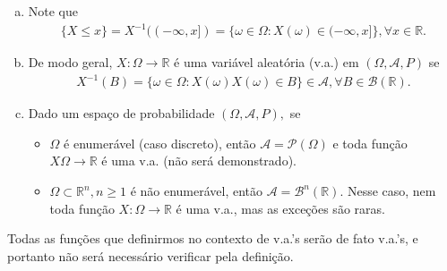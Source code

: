 \documentclass[../Notas.tex]{subfiles}
\begin{document}
\begin{remarks}
\begin{enumerate}[(a)]
    \item Note que
    \begin{align*}
        \{ X\leq x \} = X^{-1}((-\infty, x]) = \{ \omega\in\Omega : X(\omega) \in (-\infty, x] \}, \forall x\in\mathbb{R}.
    \end{align*}
    \item De modo geral, $X:\Omega\to\mathbb{R}$ é uma variável aleatória (v.a.) em $(\Omega, \mathcal{A}, P)$ se
    \begin{align*}
        X^{-1}(B) = \{ \omega\in\Omega : X(\omega) X(\omega)\in B \}\in\mathcal{A}, \forall B\in\mathcal{B}(\mathbb{R}).
    \end{align*}
    \item Dado um espaço de probabilidade $(\Omega, \mathcal{A}, P),$ se
    \begin{itemize}
        \item $\Omega$ é enumerável (caso discreto), então $\mathcal{A} = \mathcal{P}(\Omega)$ e toda função $X\Omega\to\mathbb{R}$ é uma v.a. (não será demonstrado).
        \item $\Omega\subset\mathbb{R}^n, n\geq 1$ é não enumerável, então $\mathcal{A} = \mathcal{B}^n(\mathbb{R})$. Nesse caso, nem toda função $X:\Omega\to\mathbb{R}$ é uma v.a., mas as exceções são raras.
    \end{itemize}
\end{enumerate}
Todas as funções que definirmos no contexto de v.a.'s serão de fato v.a.'s, e portanto não será necessário verificar pela definição.
\end{remarks}
\end{document}
